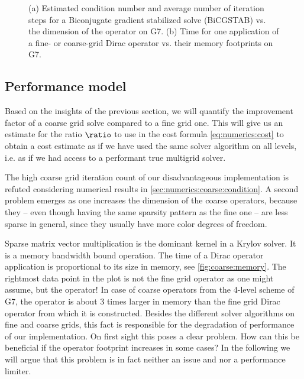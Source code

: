 
\begin{figure}
\centering

\hfill
{}

\caption{
(a) Estimated condition number and average number of iteration steps for a Biconjugate gradient stabilized solve (BiCGSTAB) vs. the dimension of the operator on G7. \takenfull
(b) Time for one application of a fine- or coarse-grid Dirac operator vs. their memory footprints on G7.
}
\label{fig:coarse}
\end{figure}

\subsection{Performance model}
\label{sec:numerics:performance:model}

Based on the insights of the previous section, we will quantify the improvement factor of a coarse grid solve compared to a fine grid one.
This will give us an estimate for the ratio $\ratio$ to use in the cost formula \cref{eq:numerics:cost} to obtain a cost estimate as if we have used the same solver algorithm on all levels, i.e. as if we had access to a performant true multigrid solver.

The high coarse grid iteration count of our disadvantageous implementation is refuted considering numerical results in \cref{sec:numerics:coarse:condition}.
A second problem emerges as one increases the dimension of the coarse operators, because they -- even though having the same sparsity pattern as the fine one -- are less sparse in general, since they usually have more color degrees of freedom.

Sparse matrix vector multiplication is the dominant kernel in a Krylov solver.
It is a memory bandwidth bound operation.
The time of a Dirac operator application is proportional to its size in memory, see \cref{fig:coarse:memory}.
The rightmost data point in the plot is not the fine grid operator as one might assume, but the  operator!
In case of coarse operators from the 4-level scheme of G7, the  operator is about \num{3} times larger in memory than the fine grid Dirac operator from which it is constructed.
Besides the different solver algorithms on fine and coarse grids, this fact is responsible for the degradation of performance of our implementation.
On first sight this poses a clear problem.
How can this be beneficial if the operator footprint increases in some cases?
In the following we will argue that this problem is in fact neither an issue and nor a performance limiter.

